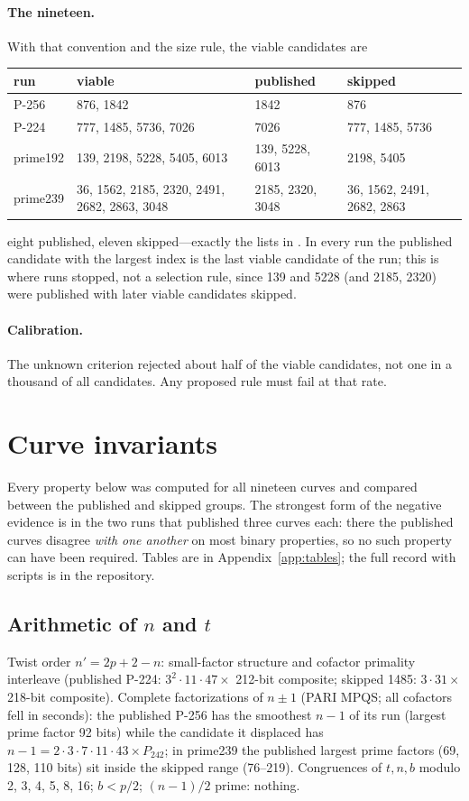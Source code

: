 \documentclass[11pt]{article}
\begin{document}
\paragraph{The nineteen.} With that convention and the size rule, the viable candidates are
\begin{center}
\begin{tabular}{llll}
\toprule
run & viable & published & skipped \\
\midrule
P-256 & 876, 1842 & 1842 & 876 \\
P-224 & 777, 1485, 5736, 7026 & 7026 & 777, 1485, 5736 \\
prime192 & 139, 2198, 5228, 5405, 6013 & 139, 5228, 6013 & 2198, 5405 \\
prime239 & 36, 1562, 2185, 2320, 2491, 2682, 2863, 3048 & 2185, 2320, 3048 & 36, 1562, 2491, 2682, 2863 \\
\bottomrule
\end{tabular}
\end{center}
eight published, eleven skipped---exactly the lists in \cite{anthropic,seeds-solved}. In every run the published candidate with the largest index is the last viable candidate of the run; this is where runs stopped, not a selection rule, since 139 and 5228 (and 2185, 2320) were published with later viable candidates skipped.

\paragraph{Calibration.} The unknown criterion rejected about half of the viable candidates, not one in a thousand of all candidates. Any proposed rule must fail at that rate.

\section{Curve invariants}\label{sec:invariants}

Every property below was computed for all nineteen curves and compared between the published and skipped groups. The strongest form of the negative evidence is in the two runs that published three curves each: there the published curves disagree \emph{with one another} on most binary properties, so no such property can have been required. Tables are in Appendix~\ref{app:tables}; the full record with scripts is in the repository.

\subsection{Arithmetic of $n$ and $t$}
Twist order $n' = 2p+2-n$: small-factor structure and cofactor primality interleave (published P-224: $3^2\cdot11\cdot47\times$ 212-bit composite; skipped 1485: $3\cdot31\times$ 218-bit composite). Complete factorizations of $n\pm1$ (PARI MPQS; all cofactors fell in seconds): the published P-256 has the smoothest $n-1$ of its run (largest prime factor 92 bits) while the candidate it displaced has $n-1 = 2\cdot3\cdot7\cdot11\cdot43\times P_{242}$; in prime239 the published largest prime factors (69, 128, 110 bits) sit inside the skipped range (76--219). Congruences of $t,n,b$ modulo 2, 3, 4, 5, 8, 16; $b<p/2$; $(n-1)/2$ prime: nothing.
\end{document}

